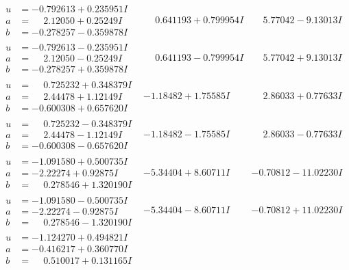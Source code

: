 \documentclass[1p]{elsarticle_modified}
\theoremstyle{definition}
\begin{document}
$$\begin{array}{c|c|c}
\begin{aligned}
u &= -0.792613 + 0.235951 I \\
a &= \phantom{-}2.12050 + 0.25249 I \\
b &= -0.278257 - 0.359878 I\end{aligned}
 & \phantom{-}0.641193 + 0.799954 I & \phantom{-}5.77042 - 9.13013 I \\ \hline\begin{aligned}
u &= -0.792613 - 0.235951 I \\
a &= \phantom{-}2.12050 - 0.25249 I \\
b &= -0.278257 + 0.359878 I\end{aligned}
 & \phantom{-}0.641193 - 0.799954 I & \phantom{-}5.77042 + 9.13013 I \\ \hline\begin{aligned}
u &= \phantom{-}0.725232 + 0.348379 I \\
a &= \phantom{-}2.44478 + 1.12149 I \\
b &= -0.600308 + 0.657620 I\end{aligned}
 & -1.18482 + 1.75585 I & \phantom{-}2.86033 + 0.77633 I \\ \hline\begin{aligned}
u &= \phantom{-}0.725232 - 0.348379 I \\
a &= \phantom{-}2.44478 - 1.12149 I \\
b &= -0.600308 - 0.657620 I\end{aligned}
 & -1.18482 - 1.75585 I & \phantom{-}2.86033 - 0.77633 I \\ \hline\begin{aligned}
u &= -1.091580 + 0.500735 I \\
a &= -2.22274 + 0.92875 I \\
b &= \phantom{-}0.278546 + 1.320190 I\end{aligned}
 & -5.34404 + 8.60711 I & -0.70812 - 11.02230 I \\ \hline\begin{aligned}
u &= -1.091580 - 0.500735 I \\
a &= -2.22274 - 0.92875 I \\
b &= \phantom{-}0.278546 - 1.320190 I\end{aligned}
 & -5.34404 - 8.60711 I & -0.70812 + 11.02230 I \\ \hline\begin{aligned}
u &= -1.124270 + 0.494821 I \\
a &= -0.416217 + 0.360770 I \\
b &= \phantom{-}0.510017 + 0.131165 I\end{aligned}

\end{array}$$
\end{document}
